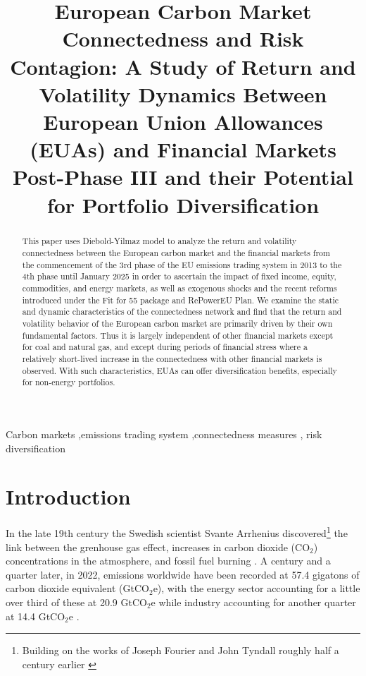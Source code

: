 \documentclass[preprint, 3p,
authoryear]{elsarticle} %
\begin{document}
\begin{frontmatter}

  \title{European Carbon Market Connectedness and Risk Contagion: A
Study of Return and Volatility Dynamics Between European Union
Allowances (EUAs) and Financial Markets Post-Phase III and their
Potential for Portfolio Diversification}
  
  \begin{abstract}
  This paper uses Diebold-Yilmaz model to analyze the return and
  volatility connectedness between the European carbon market and the
  financial markets from the commencement of the 3rd phase of the EU
  emissions trading system in 2013 to the 4th phase until January 2025
  in order to ascertain the impact of fixed income, equity, commodities,
  and energy markets, as well as exogenous shocks and the recent reforms
  introduced under the Fit for 55 package and RePowerEU Plan. We examine
  the static and dynamic characteristics of the connectedness network
  and find that the return and volatility behavior of the European
  carbon market are primarily driven by their own fundamental factors.
  Thus it is largely independent of other financial markets except for
  coal and natural gas, and except during periods of financial stress
  where a relatively short-lived increase in the connectedness with
  other financial markets is observed. With such characteristics, EUAs
  can offer diversification benefits, especially for non-energy
  portfolios.
  \end{abstract}
    \begin{keyword}
    Carbon markets \sep emissions trading system \sep connectedness
measures \sep 
    risk diversification
  \end{keyword}
  
 \end{frontmatter}

\hypertarget{introduction}{%
\section{Introduction}\label{introduction}}

In the late 19th century the Swedish scientist Svante Arrhenius
discovered\footnote{Building on the works of Joseph Fourier and John Tyndall roughly half a century earlier \citep{corfee-morlot_global_2007}}
the link between the grenhouse gas effect, increases in carbon dioxide
(CO\(_2\)) concentrations in the atmosphere, and fossil fuel burning
\citep{corfee-morlot_global_2007, hart_scientific_1993, weart_discovery_2008}.
A century and a quarter later, in 2022, emissions worldwide have been
recorded at 57.4 gigatons of carbon dioxide equivalent (GtCO\(_2\)e),
with the energy sector accounting for a little over third of these at
20.9 GtCO\(_2\)e while industry accounting for another quarter at 14.4
GtCO\(_2\)e \citep{unep_emissions_2023}.
\end{document}
